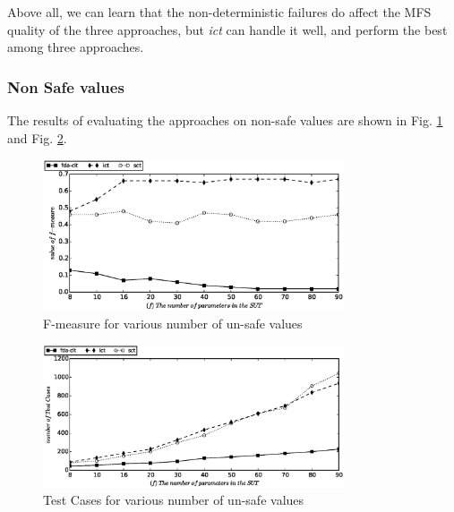 \documentclass[10pt,journal,compsoc]{IEEEtran}
\begin{document}
Above all, we can learn that the non-deterministic failures do affect the MFS quality of the three approaches, but \emph{ict} can handle it well, and perform the best among three approaches.






\subsubsection{Non Safe values}

The results of evaluating the approaches on non-safe values are shown in Fig. \ref{sen_safe_f_measure_result} and Fig. \ref{sen_safe_tests_result}.

\begin{figure}[htbp]
 \includegraphics[width=3.5in]{sen_safe_f_measure.eps}
\caption{F-measure for various number of un-safe values}
\label{sen_safe_f_measure_result}
\end{figure}


\begin{figure}[htbp]
 \includegraphics[width=3.5in]{sen_safe_tests.eps}
\caption{Test Cases for various number of un-safe values}
\label{sen_safe_tests_result}
\end{figure}
\end{document}
